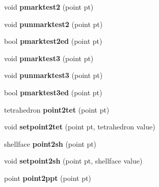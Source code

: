 \begin{DoxyCompactItemize}
\item 
\hypertarget{classtetgenmesh_ae99e753df9baa97bdc4363ce0215cbc3}{void {\bfseries pmarktest2} (point pt)}\label{classtetgenmesh_ae99e753df9baa97bdc4363ce0215cbc3}

\item 
\hypertarget{classtetgenmesh_aa4e64c4dcc39f85dfd109a274ba27085}{void {\bfseries punmarktest2} (point pt)}\label{classtetgenmesh_aa4e64c4dcc39f85dfd109a274ba27085}

\item 
\hypertarget{classtetgenmesh_ac75999fff09426c4c1cfbe334981bce0}{bool {\bfseries pmarktest2ed} (point pt)}\label{classtetgenmesh_ac75999fff09426c4c1cfbe334981bce0}

\item 
\hypertarget{classtetgenmesh_ab242764bd9b0d149339b585daad51bf5}{void {\bfseries pmarktest3} (point pt)}\label{classtetgenmesh_ab242764bd9b0d149339b585daad51bf5}

\item 
\hypertarget{classtetgenmesh_a6929e4177a6624086d1280b02a2a72e5}{void {\bfseries punmarktest3} (point pt)}\label{classtetgenmesh_a6929e4177a6624086d1280b02a2a72e5}

\item 
\hypertarget{classtetgenmesh_a53a459c8e1e5e220658ed6540577629e}{bool {\bfseries pmarktest3ed} (point pt)}\label{classtetgenmesh_a53a459c8e1e5e220658ed6540577629e}

\item 
\hypertarget{classtetgenmesh_a6c3e38cde82f108d0c0ca90d1a046931}{tetrahedron {\bfseries point2tet} (point pt)}\label{classtetgenmesh_a6c3e38cde82f108d0c0ca90d1a046931}

\item 
\hypertarget{classtetgenmesh_adcba3dbce598107f18e9990c733a20ed}{void {\bfseries setpoint2tet} (point pt, tetrahedron value)}\label{classtetgenmesh_adcba3dbce598107f18e9990c733a20ed}

\item 
\hypertarget{classtetgenmesh_a71c1fce651aaffe6e7db6c1f64f7f67d}{shellface {\bfseries point2sh} (point pt)}\label{classtetgenmesh_a71c1fce651aaffe6e7db6c1f64f7f67d}

\item 
\hypertarget{classtetgenmesh_a7f6bda7c35edc24c58af75365b42398c}{void {\bfseries setpoint2sh} (point pt, shellface value)}\label{classtetgenmesh_a7f6bda7c35edc24c58af75365b42398c}

\item 
\hypertarget{classtetgenmesh_aec54de533203c1b8371a085c1a8b9783}{point {\bfseries point2ppt} (point pt)}\label{classtetgenmesh_aec54de533203c1b8371a085c1a8b9783}


\end{DoxyCompactItemize}
